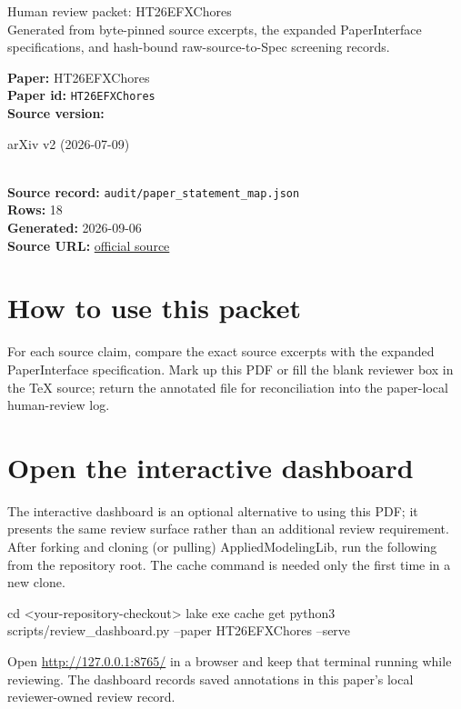 \documentclass[10pt]{article}
\begin{document}
\fontsize{9}{10}\selectfont

\begin{center}
{\LARGE Human review packet: HT26EFXChores}\\[0.35em]
\small Generated from byte-pinned source excerpts, the expanded PaperInterface
specifications, and hash-bound raw-source-to-Spec screening records.
\end{center}

\noindent\textbf{Paper:} HT26EFXChores\\
\textbf{Paper id:} \texttt{HT26EFXChores}\\
\textbf{Source version:} \parbox[t]{0.76\linewidth}{\raggedright arXiv v2 (2026-07-09)}\\
\textbf{Source record:} \texttt{audit/paper\_statement\_map.json}\\
\textbf{Rows:} 18\\
\textbf{Generated:} 2026-09-06\\
\textbf{Source URL:} \href{https://arxiv.org/abs/2606.08872v2}{official source}





\section*{How to use this packet}
For each source claim, compare the exact source excerpts with the expanded
PaperInterface specification. Mark up this PDF or fill the blank reviewer box in the TeX source;
return the annotated file for reconciliation into the paper-local human-review
log.

\section*{Open the interactive dashboard}
The interactive dashboard is an optional alternative to using this PDF; it
presents the same review surface rather than an additional review requirement.
After forking and cloning (or pulling) AppliedModelingLib, run the following from the
repository root. The cache command is needed only the first time in a new clone.
\begin{ReviewVerbatim}
cd <your-repository-checkout>
lake exe cache get
python3 scripts/review_dashboard.py --paper HT26EFXChores --serve
\end{ReviewVerbatim}
Open \url{http://127.0.0.1:8765/} in a browser and keep that terminal running
while reviewing. The dashboard records saved annotations in this paper's local
reviewer-owned review record.
\end{document}
